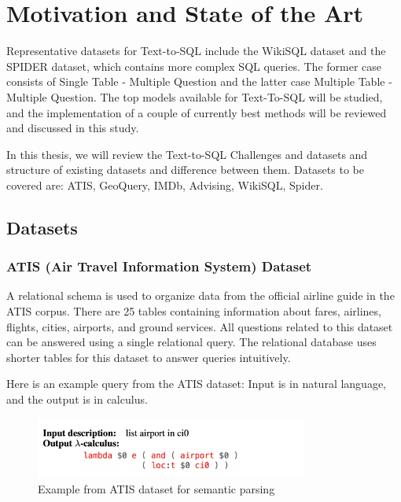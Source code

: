 

\section{Motivation and State of the Art}

Representative datasets for Text-to-SQL include the WikiSQL \cite{zhong_seq2sql_2017} dataset and the SPIDER \cite{yu_spider_2019} dataset, which contains more complex SQL queries.
The former case consists of Single Table - Multiple Question and the latter case Multiple Table - Multiple Question. The top models available for Text-To-SQL will be studied, and the implementation of a couple of currently best methods will be reviewed and discussed in this study.

In this thesis, we will review the Text-to-SQL Challenges and datasets and structure of existing datasets and difference between them. Datasets to be covered are: ATIS, GeoQuery, IMDb, Advising, WikiSQL, Spider.

\subsection*{Datasets}

\subsubsection*{ATIS (Air Travel Information System) Dataset}

A relational schema is used to organize data from the official airline guide in the ATIS corpus. There are 25 tables containing information about fares, airlines, flights, cities, airports, and ground services. All questions related to this dataset can be answered using a single relational query. The relational database uses shorter tables for this dataset to answer queries intuitively.


Here is an example query from the ATIS dataset: Input is in natural language, and the output is in \lambda calculus.

\begin{figure}[htb]
    \centering
    \includegraphics[width=0.8\textwidth]{pics/db/ATIS.png}
    \caption{Example from ATIS dataset for semantic parsing}
    \label{fig:ATIS}
\end{figure}

